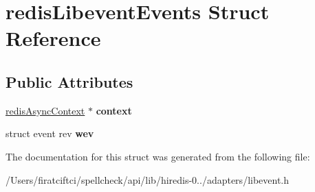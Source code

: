 \hypertarget{structredis_libevent_events}{}\section{redis\+Libevent\+Events Struct Reference}
\label{structredis_libevent_events}
\subsection*{Public Attributes}
\begin{DoxyCompactItemize}
\item 
\mbox{\label{structredis_libevent_events_aa78b057625085c0c0d47b2b54151fa3e}} 
\mbox{\hyperlink{structredis_async_context}{redis\+Async\+Context}} $\ast$ {\bfseries context}
\item 
\mbox{\label{structredis_libevent_events_ad323bfd53bac60e96a84e577b1847a50}} 
struct event rev {\bfseries wev}
\end{DoxyCompactItemize}


The documentation for this struct was generated from the following file\+:\begin{DoxyCompactItemize}
\item 
/\+Users/firatciftci/spellcheck/api/lib/hiredis-\/0../adapters/libevent.\+h\end{DoxyCompactItemize}
